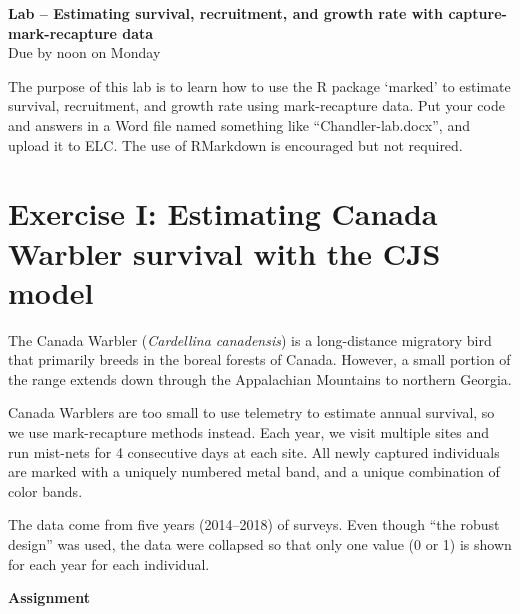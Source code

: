 \documentclass[12pt]{article}\usepackage[]{graphicx}\usepackage[]{xcolor}
\begin{document}
{
  \Large
  \centering
  {\bf Lab -- Estimating survival, recruitment, and growth rate
    with capture-mark-recapture data} \\
  Due by noon on Monday \\
}

\vspace{10pt}

The purpose of this lab is to learn how to use the R package `marked' to
estimate survival, recruitment, and growth rate using mark-recapture
data. Put your code and answers in a Word file named something like
``Chandler-lab.docx'', and upload it to ELC. The use of RMarkdown is
encouraged but not required.  



\section*{\large Exercise I: Estimating Canada Warbler survival with the CJS model}



The Canada Warbler ({\it Cardellina canadensis}) is a long-distance
migratory bird that primarily breeds in the boreal forests of
Canada. However, a small portion of the range extends down through the
Appalachian Mountains to northern Georgia.

Canada Warblers are too small to use telemetry to estimate annual
survival, so we use mark-recapture methods instead. Each year, we
visit multiple sites and run mist-nets for 4 consecutive days at each
site. All newly captured individuals are marked with a uniquely
numbered metal band, and a unique combination of color bands.

The data come from five years (2014--2018) of surveys. Even though
``the robust design'' was used, the data were collapsed so that only
one value (0 or 1) is shown for each year for each individual.

{\bf Assignment}
\end{document}
